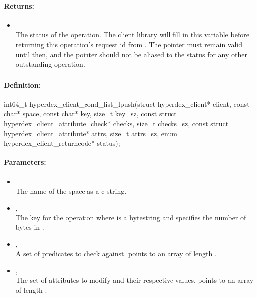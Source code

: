 \paragraph{Returns:}
\begin{itemize}[noitemsep]
\item {}\\
The status of the operation.  The client library will fill in this variable before returning this operation's request id from .  The pointer must remain valid until then, and the pointer should not be aliased to the status for any other outstanding operation.
\end{itemize}

\pagebreak
\subsubsection{}
\label{api:c:cond_list_lpush}


\paragraph{Definition:}
\begin{ccode}
int64_t hyperdex_client_cond_list_lpush(struct hyperdex_client* client,
        const char* space,
        const char* key, size_t key_sz,
        const struct hyperdex_client_attribute_check* checks, size_t checks_sz,
        const struct hyperdex_client_attribute* attrs, size_t attrs_sz,
        enum hyperdex_client_returncode* status);
\end{ccode}

\paragraph{Parameters:}
\begin{itemize}[noitemsep]
\item {}\\
The name of the space as a c-string.
\item {}, \\
The key for the operation where  is a bytestring and  specifies the number of bytes in .
\item {}, \\
A set of predicates to check against.   points to an array of length .
\item {}, \\
The set of attributes to modify and their respective values.   points to an array of length .
\end{itemize}

